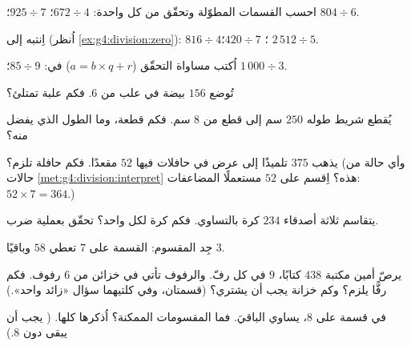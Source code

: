 \begin{exercise}[$\star$]\label{exo:g4:division:2}
احسب القسمات المطوّلة وتحقّق من كل واحدة:
$672 \div 4$؛ \quad $925 \div 7$؛ \quad $804 \div 6$.
\end{exercise}

\begin{exercise}[$\star$]\label{exo:g4:division:3}
اِنتبه إلى  (اُنظر \cref{ex:g4:division:zero}):
$816 \div 4$؛ \quad $420 \div 7$؛ \quad $2\,512 \div 5$.
\end{exercise}

\begin{exercise}[$\star$]\label{exo:g4:division:4}
اُكتب مساواة التحقّق ($a = b \times q + r$) في: $85 \div 9$؛
\quad $1\,000 \div 3$.
\end{exercise}

\begin{exercise}[$\star$]\label{exo:g4:division:5}
تُوضع $156$ بيضة في علب من $6$. فكم علبة تمتلئ؟
\end{exercise}

\begin{exercise}[$\star$]\label{exo:g4:division:6}
يُقطع شريط طوله $250$ سم إلى قطع من $8$ سم. فكم قطعة،
وما الطول الذي يفضل منه؟
\end{exercise}

\begin{exercise}[$\star$]\label{exo:g4:division:7}
يذهب $375$ تلميذًا إلى عرض في حافلات فيها $52$ مقعدًا. فكم
حافلة تلزم؟ (وأي حالة من حالات
\cref{met:g4:division:interpret} هذه؟ اِقسم على $52$ مستعملًا
المضاعفات: $52 \times 7 = 364$.)
\end{exercise}

\begin{exercise}[$\star$]\label{exo:g4:division:8}
يتقاسم ثلاثة أصدقاء $234$ كرة بالتساوي. فكم كرة لكل واحد؟
تحقّق بعملية ضرب.
\end{exercise}

\begin{exercise}[$\star$]\label{exo:g4:division:9}
جِد المقسوم: القسمة على $7$ تعطي  $58$
وباقيًا $3$.
\end{exercise}

\begin{exercise}[$\star\star$]\label{exo:g4:division:10}
يرصّ أمين مكتبة $438$ كتابًا، $9$ في كل رفّ. والرفوف تأتي في
خزائن من $6$ رفوف. فكم رفًّا يلزم؟ وكم خزانة يجب أن
يشتري؟ (قسمتان، وفي كلتيهما سؤال
«زائد واحد».)
\end{exercise}

\begin{exercise}[$\star\star$]\label{exo:g4:division:11}
في قسمة على $8$، يساوي  الباقيَ. فما المقسومات
الممكنة؟ اُذكرها كلها. ( يجب أن يبقى
دون $8$.)
\end{exercise}

